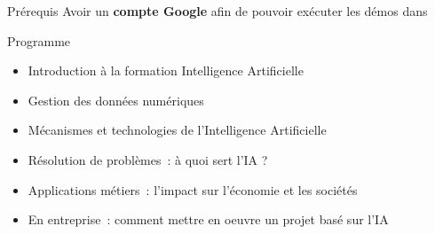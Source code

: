 
\begin{frame}{Prérequis}
  Avoir un \textbf{compte Google} afin de pouvoir exécuter les démos dans 
\end{frame}

\begin{frame}{Programme}
  \begin{itemize}
  \item Introduction à la formation Intelligence Artificielle
  \item Gestion des données numériques
  \item Mécanismes et technologies de l'Intelligence Artificielle
  \item Résolution de problèmes : à quoi sert l'IA ?
  \item Applications métiers : l'impact sur l'économie et les sociétés
  \item En entreprise : comment mettre en oeuvre un projet basé sur l'IA
  \end{itemize}
\end{frame}
